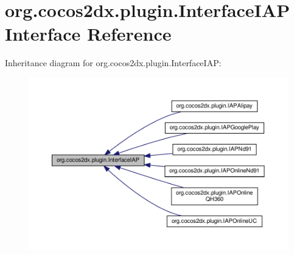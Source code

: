 \hypertarget{interfaceorg_1_1cocos2dx_1_1plugin_1_1InterfaceIAP}{}\section{org.\+cocos2dx.\+plugin.\+Interface\+I\+AP Interface Reference}
\label{interfaceorg_1_1cocos2dx_1_1plugin_1_1InterfaceIAP}


Inheritance diagram for org.\+cocos2dx.\+plugin.\+Interface\+I\+AP\+:
\nopagebreak
\begin{figure}[H]
\begin{center}
\leavevmode
\includegraphics[width=350pt]{interfaceorg_1_1cocos2dx_1_1plugin_1_1InterfaceIAP__inherit__graph}
\end{center}
\end{figure}
